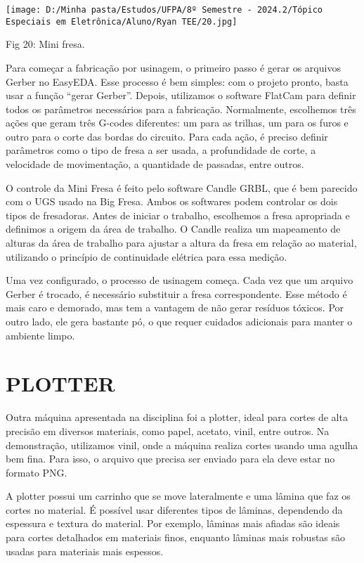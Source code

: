 \documentclass[
]{book}
\begin{document}
\texttt{[image: D:/Minha pasta/Estudos/UFPA/8º Semestre - 2024.2/Tópico Especiais em Eletrônica/Aluno/Ryan TEE/20.jpg]}

Fig 20: Mini fresa.

Para começar a fabricação por usinagem, o primeiro passo é gerar os arquivos Gerber no EasyEDA. Esse processo é bem simples: com o projeto pronto, basta usar a função ``gerar Gerber''. Depois, utilizamos o software FlatCam para definir todos os parâmetros necessários para a fabricação. Normalmente, escolhemos três ações que geram três G-codes diferentes: um para as trilhas, um para os furos e outro para o corte das bordas do circuito. Para cada ação, é preciso definir parâmetros como o tipo de fresa a ser usada, a profundidade de corte, a velocidade de movimentação, a quantidade de passadas, entre outros.

O controle da Mini Fresa é feito pelo software Candle GRBL, que é bem parecido com o UGS usado na Big Fresa. Ambos os softwares podem controlar os dois tipos de fresadoras. Antes de iniciar o trabalho, escolhemos a fresa apropriada e definimos a origem da área de trabalho. O Candle realiza um mapeamento de alturas da área de trabalho para ajustar a altura da fresa em relação ao material, utilizando o princípio de continuidade elétrica para essa medição.

Uma vez configurado, o processo de usinagem começa. Cada vez que um arquivo Gerber é trocado, é necessário substituir a fresa correspondente. Esse método é mais caro e demorado, mas tem a vantagem de não gerar resíduos tóxicos. Por outro lado, ele gera bastante pó, o que requer cuidados adicionais para manter o ambiente limpo.

\chapter{PLOTTER}\label{plotter}

Outra máquina apresentada na disciplina foi a plotter, ideal para cortes de alta precisão em diversos materiais, como papel, acetato, vinil, entre outros. Na demonstração, utilizamos vinil, onde a máquina realiza cortes usando uma agulha bem fina. Para isso, o arquivo que precisa ser enviado para ela deve estar no formato PNG.

A plotter possui um carrinho que se move lateralmente e uma lâmina que faz os cortes no material. É possível usar diferentes tipos de lâminas, dependendo da espessura e textura do material. Por exemplo, lâminas mais afiadas são ideais para cortes detalhados em materiais finos, enquanto lâminas mais robustas são usadas para materiais mais espessos.
\end{document}
